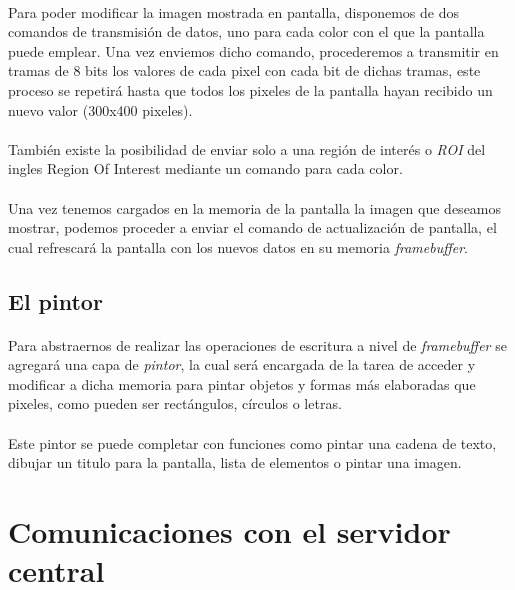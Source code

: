 \paragraph{} Para poder modificar la imagen mostrada en pantalla, disponemos de dos comandos de transmisión de datos, uno para cada color con el que la pantalla puede emplear. Una vez enviemos dicho comando, procederemos a transmitir en tramas de 8 bits los valores de cada pixel con cada bit de dichas tramas, este proceso se repetirá hasta que todos los pixeles de la pantalla hayan recibido un nuevo valor (300x400 pixeles).

\paragraph{} También existe la posibilidad de enviar solo a una región de interés o \textit{ROI} del ingles Region Of Interest mediante un comando para cada color.

\paragraph{} Una vez tenemos cargados en la memoria de la pantalla la imagen que deseamos mostrar, podemos proceder a enviar el comando de actualización de pantalla, el cual refrescará la pantalla con los nuevos datos en su memoria \textit{framebuffer}.

\subsection{El pintor}

\paragraph{} Para abstraernos de realizar las operaciones de escritura a nivel de \textit{framebuffer} se agregará una capa de \textit{pintor}, la cual será encargada de la tarea de acceder y modificar a dicha memoria para pintar objetos y formas más elaboradas que pixeles, como pueden ser rectángulos, círculos o letras.

\paragraph{} Este pintor se puede completar con funciones como pintar una cadena de texto, dibujar un titulo para la pantalla, lista de elementos o pintar una imagen.

\section{Comunicaciones con el servidor central}

